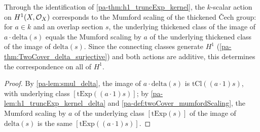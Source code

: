 \begin{theorem}
  \label{pa-thm:mumfordScaling_equivariance}
  \leanok

  Through the identification of \ref{pa-thm:h1_truncExp_kernel}, the \(k\)-scalar action
  on \(H^1(X, \mathcal{O}_{X})\) corresponds to the Mumford scaling of the thickened
  \v{C}ech group: for \(a \in k\) and an overlap section \(s\), the underlying
  thickened class of the image of \(a \cdot \mathrm{delta}(s)\) equals the Mumford
  scaling by \(a\) of the underlying thickened class of the image of
  \(\mathrm{delta}(s)\). Since the connecting classes generate \(H^1\)
  (\ref{pa-thm:TwoCover_delta_surjective}) and both actions are additive, this determines
  the correspondence on all of \(H^1\).
\end{theorem}
\begin{proof}
  \leanok
  By \ref{pa-lem:smul_delta}, the image of \(a \cdot \mathrm{delta}(s)\) is
  \(\mathrm{tCl}((a \cdot 1) s)\), with underlying class
  \([\mathrm{tExp}((a \cdot 1) s)]\); by \ref{pa-lem:h1_truncExp_kernel_delta} and
  \ref{pa-def:twoCover_mumfordScaling}, the Mumford scaling by \(a\) of the underlying
  class \([\mathrm{tExp}(s)]\) of the image of \(\mathrm{delta}(s)\) is the same
  \([\mathrm{tExp}((a \cdot 1) s)]\).
\end{proof}
